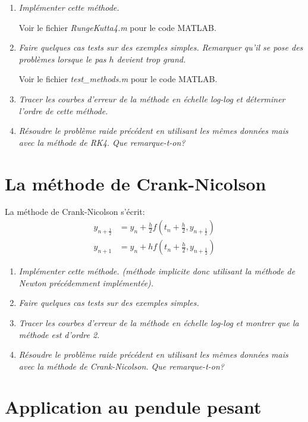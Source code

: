\documentclass[a4paper,10pt]{article}
\begin{document}
\begin{enumerate}
    \item \emph{Implémenter cette méthode.}

    Voir le fichier \emph{RungeKutta4.m} pour le code MATLAB.

    \item \emph{Faire quelques cas tests sur des exemples simples. Remarquer qu'il se
    pose des problèmes lorsque le pas $h$ devient trop grand.}

    Voir le fichier \emph{test\_methods.m} pour le code MATLAB.

    \item \emph{Tracer les courbes d'erreur de la méthode en échelle log-log et
    déterminer l'ordre de cette méthode.}

    \item \emph{Résoudre le problème raide précédent en utilisant les mêmes données
    mais avec la méthode de RK4. Que remarque-t-on?}
\end{enumerate}

\section{La méthode de Crank-Nicolson}

La méthode de Crank-Nicolson s'écrit:
\begin{align}
    y_{n + \frac{1}{2}} & = y_n + \frac{h}{2} f(t_n + \frac{h}{2}, y_{n + \frac{1}{2}})
    \\\nonumber
    y_{n + 1} & = y_n + hf(t_n + \frac{h}{2}, y_{n + \frac{1}{2}})
\end{align}

\begin{enumerate}
    \item \emph{Implémenter cette méthode. (méthode implicite donc utilisant la
    méthode de Newton précédemment implémentée).}

    \item \emph{Faire quelques cas tests sur des exemples simples.}

    \item \emph{Tracer les courbes d'erreur de la méthode en échelle log-log et montrer
    que la méthode est d'ordre 2.}

    \item \emph{Résoudre le problème raide précédent en utilisant les mêmes données mais
    avec la méthode de Crank-Nicolson. Que remarque-t-on?}
\end{enumerate}

\section{Application au pendule pesant}
\end{document}
